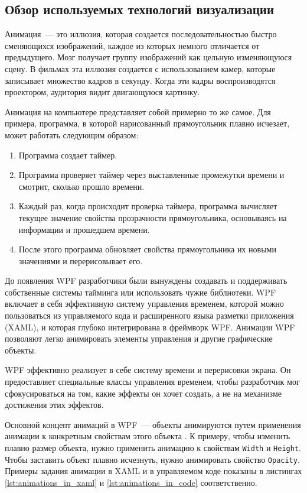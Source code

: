 \subsection{Обзор используемых технологий визуализации}
Анимация~--- это иллюзия, которая создается последовательностью быстро сменяющихся изображений, каждое из которых немного отличается от предыдущего. Мозг получает группу изображений как цельную изменяющуюся сцену. В фильмах эта иллюзия создается с использованием камер, которые записывает множество кадров в секунду. Когда эти кадры воспроизводятся проектором, аудитория видит двигающуюся картинку.

Анимация на компьютере представляет собой примерно то же самое. Для примера, программа, в которой нарисованный прямоугольник плавно исчезает, может работать следующим образом:
\begin{enumerate}
  \item Программа создает таймер.
  \item Программа проверяет таймер через выставленные промежутки времени и смотрит, сколько прошло времени.
  \item Каждый раз, когда происходит проверка таймера, программа вычисляет текущее значение свойства прозрачности прямоугольника, основываясь на информации и прошедшем времени.
  \item После этого программа обновляет свойства прямоугольника их новыми значениями и перерисовывает его.
\end{enumerate}

До появления WPF разработчики были вынуждены создавать и поддерживать собственные системы тайминга или использовать чужие библиотеки. WPF включает в себя эффективную систему управления временем, которой можно пользоваться из управляемого кода и расширенного языка разметки приложения (XAML\cite{xaml}), и которая глубоко интегрирована в фреймворк WPF. Анимации WPF позволяют легко анимировать элементы управления и другие графические объекты.

WPF эффективно реализует в себе систему времени и перерисовки экрана. Он предоставляет специальные классы управления временем, чтобы разработчик мог сфокусироваться на том, какие эффекты он хочет создать, а не на механизме достижения этих эффектов.

Основной концепт анимаций в WPF~--- объекты анимируются путем применения анимации к конкретным свойствам этого объекта \cite{wpf_animation}. К примеру, чтобы изменить плавно размер объекта, нужно применить анимацию к свойствам \texttt{Width} и \texttt{Height}. Чтобы заставить объект плавно исчезнуть, нужно анимировать свойство \texttt{Opacity}. Примеры задания анимации в XAML и в управляемом коде показаны в листингах \ref{lst:animations_in_xaml} и \ref{lst:animations_in_code} соответственно.


